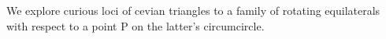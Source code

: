 We explore curious loci of cevian triangles to a family of rotating equilaterals with respect to a point P on the latter's circumcircle.